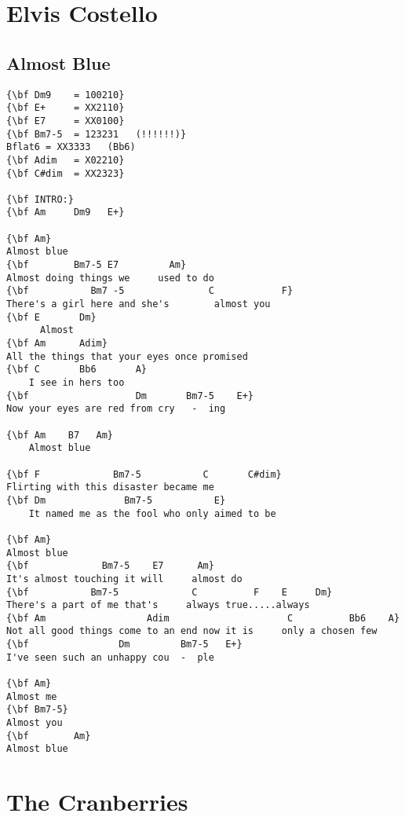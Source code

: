 \documentclass[a4paper]{article}
\begin{document}
\section{Elvis Costello} %
\label{sec:Elvis Costello}
\subsection{Almost Blue} %
\label{sub:Almost Blue}
\begin{Verbatim}[commandchars=\\\{\}]
{\bf Dm9    = 100210}
{\bf E+     = XX2110}
{\bf E7     = XX0100}
{\bf Bm7-5  = 123231   (!!!!!!)}
Bflat6 = XX3333   (Bb6)
{\bf Adim   = X02210}
{\bf C#dim  = XX2323}

{\bf INTRO:}
{\bf Am     Dm9   E+}

{\bf Am}
Almost blue
{\bf        Bm7-5 E7         Am}
Almost doing things we     used to do
{\bf           Bm7 -5               C            F}
There's a girl here and she's        almost you
{\bf E       Dm}
      Almost
{\bf Am      Adim}
All the things that your eyes once promised
{\bf C       Bb6       A}
    I see in hers too
{\bf                   Dm       Bm7-5    E+}
Now your eyes are red from cry   -  ing

{\bf Am    B7   Am}
    Almost blue

{\bf F             Bm7-5           C       C#dim}
Flirting with this disaster became me
{\bf Dm              Bm7-5           E}
    It named me as the fool who only aimed to be

{\bf Am}
Almost blue
{\bf             Bm7-5    E7      Am}
It's almost touching it will     almost do
{\bf           Bm7-5             C          F    E     Dm}
There's a part of me that's     always true.....always
{\bf Am                  Adim                     C          Bb6    A}
Not all good things come to an end now it is     only a chosen few
{\bf                Dm         Bm7-5   E+}
I've seen such an unhappy cou  -  ple

{\bf Am}
Almost me
{\bf Bm7-5}
Almost you
{\bf        Am}
Almost blue
\end{Verbatim}
\newpage
\section{The Cranberries} %
\label{sec:The Cranberries}
\end{document}
